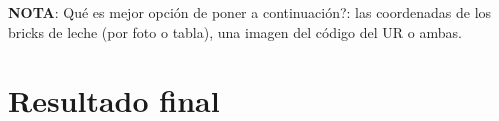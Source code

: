 \textbf{NOTA}: Qué es mejor opción de poner a continuación?: las coordenadas de los bricks de leche (por foto o tabla), una imagen del código del UR o ambas.

\clearpage



\section{Resultado final}
\label{sec:resultado_final}





